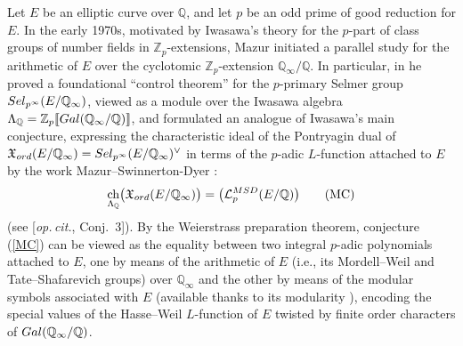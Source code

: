 \documentclass[a4paper,10pt]{amsart}
\numberwithin{equation}{section}
\numberwithin{equation}{section}
\theoremstyle{plain}
\theoremstyle{definition}
\theoremstyle{definition}
\theoremstyle{plain}
\theoremstyle{plain}
\theoremstyle{plain}
\theoremstyle{plain}
\newcommand{\Z}{\mathbb{Z}}
\newcommand{\Q}{\mathbb{Q}}
\newcommand{\X}{\mathfrak{X}}
\DeclareMathOperator{\ch}{ch}
\newcommand{\Lcal}{\mathcal{L}}
\newcommand{\rH}{\mathrm{H}}
\begin{document}
Let $E$ be an elliptic curve over $\Q$, and let $p$ be an odd prime of good reduction for $E$. In the early 1970s, motivated by Iwasawa's theory for the $p$-part of class groups of number fields in $\Z_p$-extensions, Mazur 
initiated a parallel study for the arithmetic of $E$ over the cyclotomic $\Z_p$-extension $\Q_\infty/\Q$. In particular, in \cite{mazur-towers} he proved a foundational ``control theorem'' for the $p$-primary Selmer group ${\rm Sel}_{p^\infty}(E/\Q_\infty)$, viewed as a module over the Iwasawa algebra $\Lambda_\Q=\Z_p\llbracket{{\rm Gal}(\Q_\infty/\Q)\rrbracket}$,  
and formulated an analogue of Iwasawa's main conjecture, expressing the characteristic ideal of the Pontryagin dual of $\X_{\rm ord}(E/\Q_\infty)={\rm Sel}_{p^\infty}(E/\Q_\infty)^\vee$ in terms of the $p$-adic $L$-function attached to $E$ by the work Mazur--Swinnerton-Dyer \cite{M-SwD}:
\begin{equation}\label{MC}
\ch_{\Lambda_\Q}\bigl(\X_{\rm ord}(E/\Q_\infty)\bigr)\overset{}=\bigl(\Lcal_p^{\rm MSD}(E/\Q)\bigr)\tag{MC}
\end{equation}
(see [\emph{op.\,cit.}, Conj.~3]). By the Weierstrass preparation theorem, conjecture (\ref{MC}) can be viewed as the equality between two integral $p$-adic polynomials attached to $E$, one by means of the arithmetic of $E$ (i.e., its Mordell--Weil and Tate--Shafarevich groups) 
over $\Q_\infty$ and the other by 
means of the modular symbols associated with $E$ (available thanks to its modularity \cite{wiles,TW,BCDT}), encoding the special values of the Hasse--Weil $L$-function of $E$ twisted by finite order characters of ${\rm Gal}(\Q_\infty/\Q)$.  
\end{document}
